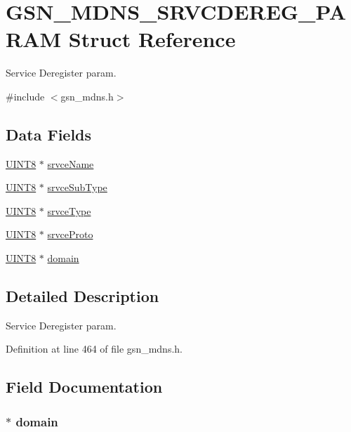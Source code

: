 \hypertarget{a00147}{
\section{GSN\_\-MDNS\_\-SRVCDEREG\_\-PARAM Struct Reference}
\label{a00147}
}


Service Deregister param.  




{\ttfamily \#include $<$gsn\_\-mdns.h$>$}

\subsection*{Data Fields}
\begin{DoxyCompactItemize}
\item 
\hyperlink{a00660_gab27e9918b538ce9d8ca692479b375b6a}{UINT8} $\ast$ \hyperlink{a00147_a04b7b35934b06d9d838a42dc302525c4}{srvceName}
\item 
\hyperlink{a00660_gab27e9918b538ce9d8ca692479b375b6a}{UINT8} $\ast$ \hyperlink{a00147_a1abfc1470aad0566d2bd0f9566dced35}{srvceSubType}
\item 
\hyperlink{a00660_gab27e9918b538ce9d8ca692479b375b6a}{UINT8} $\ast$ \hyperlink{a00147_ae936821f0b28aba244cd7270eab50b96}{srvceType}
\item 
\hyperlink{a00660_gab27e9918b538ce9d8ca692479b375b6a}{UINT8} $\ast$ \hyperlink{a00147_a9dd2986de2728362170d70c3a10d605c}{srvceProto}
\item 
\hyperlink{a00660_gab27e9918b538ce9d8ca692479b375b6a}{UINT8} $\ast$ \hyperlink{a00147_a3498b70cb998dd924ec4aea5780b9696}{domain}
\end{DoxyCompactItemize}


\subsection{Detailed Description}
Service Deregister param. 

Definition at line 464 of file gsn\_\-mdns.h.



\subsection{Field Documentation}
\hypertarget{a00147_a3498b70cb998dd924ec4aea5780b9696}{
\subsubsection[{domain}]{$\ast$ {\bf domain}}}
\label{a00147_a3498b70cb998dd924ec4aea5780b9696}


